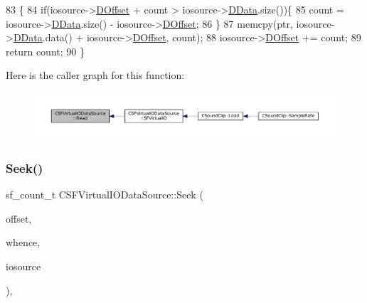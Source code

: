 \begin{DoxyCode}
83                                                                                                     \{
84     \textcolor{keywordflow}{if}(iosource->\hyperlink{classCSFVirtualIODataSource_a29db7bf8a3a7103deacb80bf619919c8}{DOffset} + count > iosource->\hyperlink{classCSFVirtualIODataSource_ac03be5c46b6647150e12edc04fa52ede}{DData}.size())\{
85         count = iosource->\hyperlink{classCSFVirtualIODataSource_ac03be5c46b6647150e12edc04fa52ede}{DData}.size() - iosource->\hyperlink{classCSFVirtualIODataSource_a29db7bf8a3a7103deacb80bf619919c8}{DOffset};
86     \}
87     memcpy(ptr, iosource->\hyperlink{classCSFVirtualIODataSource_ac03be5c46b6647150e12edc04fa52ede}{DData}.data() + iosource->\hyperlink{classCSFVirtualIODataSource_a29db7bf8a3a7103deacb80bf619919c8}{DOffset}, count);
88     iosource->\hyperlink{classCSFVirtualIODataSource_a29db7bf8a3a7103deacb80bf619919c8}{DOffset} += count;
89     \textcolor{keywordflow}{return} count;
90 \}
\end{DoxyCode}
Here is the caller graph for this function\+:\nopagebreak
\begin{figure}[H]
\begin{center}
\leavevmode
\includegraphics[width=350pt]{classCSFVirtualIODataSource_a40021962590f0911d8af1020397fbba1_icgraph}
\end{center}
\end{figure}
\hypertarget{classCSFVirtualIODataSource_a04735e135ffc05dd53fce944e772fcfc}{}\label{classCSFVirtualIODataSource_a04735e135ffc05dd53fce944e772fcfc} 
\subsubsection{\texorpdfstring{Seek()}{Seek()}}
{\footnotesize\ttfamily sf\+\_\+count\+\_\+t C\+S\+F\+Virtual\+I\+O\+Data\+Source\+::\+Seek (\begin{DoxyParamCaption}\item[{sf\+\_\+count\+\_\+t}]{offset,  }\item[{int}]{whence,  }\item[{\hyperlink{classCSFVirtualIODataSource}{C\+S\+F\+Virtual\+I\+O\+Data\+Source} $\ast$}]{iosource }\end{DoxyParamCaption})\hspace{0.3cm}{\ttfamily [static]}, {\ttfamily [protected]}}



